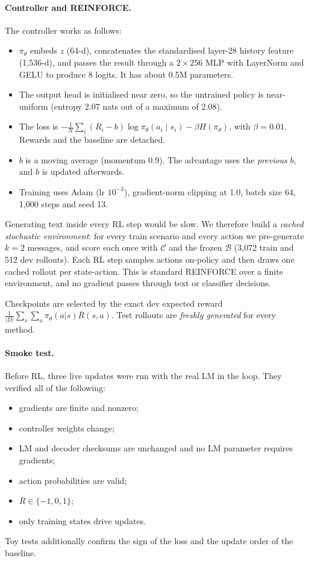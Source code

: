 \documentclass[10pt,a4paper,twocolumn]{article}
\newcommand{\1}{\mathbb{1}}
\newcommand{\B}{\mathcal{B}}
\newcommand{\C}{\mathcal{C}}
\begin{document}
\paragraph{Controller and REINFORCE.} The controller works as follows:
\begin{itemize}
\item $\pi_\theta$ embeds $z$ (64-d), concatenates the standardised layer-28 history feature (1{,}536-d), and passes the result through a $2{\times}256$ MLP with LayerNorm and GELU to produce 8 logits. It has about 0.5M parameters.
\item The output head is initialised near zero, so the untrained policy is near-uniform (entropy 2.07 nats out of a maximum of 2.08).
\item The loss is $-\tfrac1N\sum_i (R_i-b)\log\pi_\theta(a_i\mid s_i)-\beta H(\pi_\theta)$, with $\beta=0.01$. Rewards and the baseline are detached.
\item $b$ is a moving average (momentum 0.9). The advantage uses the \emph{previous} $b$, and $b$ is updated afterwards.
\item Training uses Adam (lr $10^{-3}$), gradient-norm clipping at 1.0, batch size 64, 1{,}000 steps and seed 13.
\end{itemize}

Generating text inside every RL step would be slow. We therefore build a \emph{cached stochastic environment}: for every train scenario and every action we pre-generate $k{=}2$ messages, and score each once with $\C$ and the frozen $\B$ (3{,}072 train and 512 dev rollouts). Each RL step samples actions on-policy and then draws one cached rollout per state-action. This is standard REINFORCE over a finite environment, and no gradient passes through text or classifier decisions.

Checkpoints are selected by the exact dev expected reward $\frac1{|D|}\sum_s\sum_a\pi_\theta(a|s)\bar R(s,a)$. Test rollouts are \emph{freshly generated} for every method.

\paragraph{Smoke test.} Before RL, three live updates were run with the real LM in the loop. They verified all of the following:
\begin{itemize}
\item gradients are finite and nonzero;
\item controller weights change;
\item LM and decoder checksums are unchanged and no LM parameter requires gradients;
\item action probabilities are valid;
\item $R\in\{-1,0,1\}$;
\item only training states drive updates.
\end{itemize}
Toy tests additionally confirm the sign of the loss and the update order of the baseline.
\end{document}
